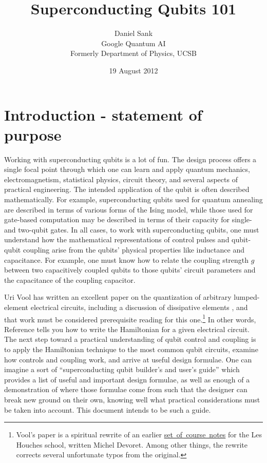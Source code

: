 \documentclass[twocolumn]{article}
\title{Superconducting Qubits 101}
\author{Daniel Sank \\
\small Google Quantum AI \\
\small Formerly Department of Physics, UCSB}
\date{19 August 2012}
\begin{document}
\maketitle
\tableofcontents

\section{Introduction - statement of purpose}

Working with superconducting qubits is a lot of fun.
The design process offers a single focal point through which one can learn and apply quantum mechanics, electromagnetism, statistical physics, circuit theory, and several aspects of practical engineering.
The intended application of the qubit is often described mathematically.
For example, superconducting qubits used for quantum annealing are described in terms of various forms of the Ising model, while those used for gate-based computation may be described in terms of their capacity for single- and two-qubit gates.
In all cases, to work with superconducting qubits, one must understand how the mathematical representations of control pulses and qubit-qubit coupling arise from the qubits' physical properties like inductance and capacitance.
For example, one must know how to relate the coupling strength $g$ between two capacitively coupled qubits to those qubits' circuit parameters and the capacitance of the coupling capacitor.

Uri Vool has written an excellent paper on the quantization of arbitrary lumped-element electrical circuits, including a discussion of dissipative elements \cite{Vool:quantumCircuits}, and that work must be considered prerequisite reading for this one.\footnote{Vool's paper is a spiritual rewrite of an earlier \mbox{\href{http://qulab.eng.yale.edu/documents/reprints/Houches_fluctuations.pdf}{set of course notes}} for the Les Houches school, written Michel Devoret. Among other things, the rewrite corrects several unfortunate typos from the original.}
In other words, Reference \cite{Vool:quantumCircuits} tells you how to write the Hamiltonian for a given electrical circuit.
The next step toward a practical understanding of qubit control and coupling is to apply the Hamiltonian technique to the most common qubit circuits, examine how controls and coupling work, and arrive at useful design formulae.
One can imagine a sort of ``superconducting qubit builder's and user's guide'' which provides a list of useful and important design formulae, as well as enough of a demonstration of where those formulae come from such that the designer can break new ground on their own, knowing well what practical considerations must be taken into account.
This document intends to be such a guide.
\end{document}
